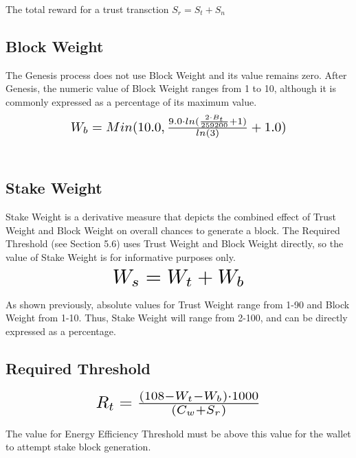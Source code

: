 \documentclass[11pt]{article}
\begin{document}
\noindent The total reward for a trust transction $S_{r} = S_{t} + S_{n}$


\subsection{Block Weight}
The Genesis process does not use Block Weight and its value remains zero. After Genesis, the numeric value of Block Weight ranges from 1 to 10, although it is commonly expressed as a percentage of its maximum value.\\

\begin{equation}
\resizebox{.65\hsize}{!}{$W_{b} = Min(10.0, \frac{9.0 \cdot ln(\frac{2 \cdot B_{t}}{259200} + 1)}{ln(3)} + 1.0)$}
\end{equation}\\


\subsection{Stake Weight}
Stake Weight is a derivative measure that depicts the combined effect of Trust Weight and Block Weight on overall chances to generate a block. The Required Threshold (see Section 5.6) uses Trust Weight and Block Weight directly, so the value of Stake Weight is for informative purposes only.\\

\begin{equation}
\resizebox{.40\hsize}{!}{$W_{s} = W_{t} + W_{b}$}
\end{equation}

\noindent As shown previously, absolute values for Trust Weight range from 1-90 and Block Weight from 1-10. Thus, Stake Weight will range from 2-100, and can be directly expressed as a percentage.\\


\subsection{Required Threshold}

\begin{equation}
\resizebox{.5\hsize}{!}{$R_{t} = \frac{(108 - W_{t} - W_{b}) \cdot 1000}{(C_{w} + S_{r})}$}
\end{equation}


\noindent The value for Energy Efficiency Threshold must be above this value for the wallet to attempt stake block generation.\\
\end{document}
